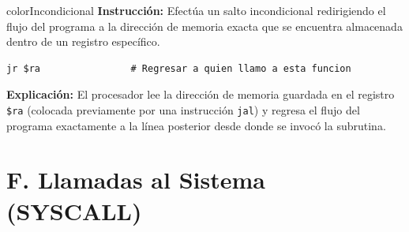 \documentclass[12pt,a4paper]{article}
\begin{document}
\begin{instructionBox}{colorIncondicional}
\textbf{Instrucción:} Efectúa un salto incondicional redirigiendo el flujo del programa a la dirección de memoria exacta que se encuentra almacenada dentro de un registro específico.
\begin{lstlisting}
jr $ra                # Regresar a quien llamo a esta funcion
\end{lstlisting}
\textbf{Explicación:} El procesador lee la dirección de memoria guardada en el registro \texttt{\$ra} (colocada previamente por una instrucción \texttt{jal}) y regresa el flujo del programa exactamente a la línea posterior desde donde se invocó la subrutina.
\end{instructionBox}

\section*{\textcolor{colorSyscall}{F. Llamadas al Sistema (SYSCALL)}}
\end{document}

